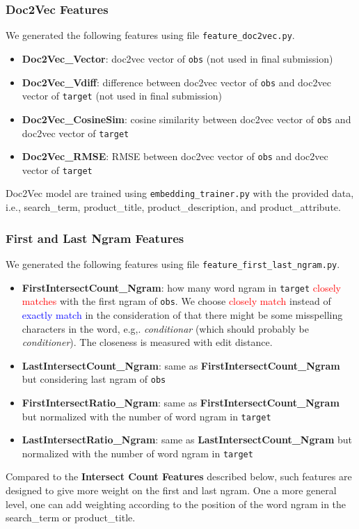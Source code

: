 \documentclass[12pt]{article}
\begin{document}
{{\subsubsection{Doc2Vec Features}
We generated the following features using file \texttt{feature\_doc2vec.py}.
\begin{itemize}
\item \textbf{Doc2Vec\_Vector}: doc2vec vector of \texttt{obs} (not used in final submission)
\item \textbf{Doc2Vec\_Vdiff}: difference between doc2vec vector of \texttt{obs} and doc2vec vector of \texttt{target} (not used in final submission)
\item \textbf{Doc2Vec\_CosineSim}: cosine similarity between doc2vec vector of \texttt{obs} and doc2vec vector of \texttt{target}
\item \textbf{Doc2Vec\_RMSE}: RMSE between doc2vec vector of \texttt{obs} and doc2vec vector of \texttt{target}
\end{itemize}

Doc2Vec model are trained using \texttt{embedding\_trainer.py} with the provided data, i.e., search\_term, product\_title, product\_description, and product\_attribute.

\subsubsection{First and Last Ngram Features}
\label{subsubsec:Feature:Chenglong:First_Last_Ngram}
We generated the following features using file \texttt{feature\_first\_last\_ngram.py}.
\begin{itemize}
\item \textbf{FirstIntersectCount\_Ngram}: how many word ngram in \texttt{target} \textcolor{red}{closely matches} with the first ngram of \texttt{obs}. We choose \textcolor{red}{closely match} instead of \textcolor{blue}{exactly match} in the consideration of that there might be some misspelling characters in the word, e.g,. \emph{conditionar} (which should probably be \emph{conditioner}). The closeness is measured with edit distance.
\item \textbf{LastIntersectCount\_Ngram}: same as \textbf{FirstIntersectCount\_Ngram} but considering last ngram of \texttt{obs}
\item \textbf{FirstIntersectRatio\_Ngram}: same as \textbf{FirstIntersectCount\_Ngram} but normalized with the number of word ngram in \texttt{target}
\item \textbf{LastIntersectRatio\_Ngram}: same as \textbf{LastIntersectCount\_Ngram} but normalized with the number of word ngram in \texttt{target}
\end{itemize}
Compared to the \textbf{Intersect Count Features} described below, such features are designed to give more weight on the first and last ngram. One a more general level, one can add weighting according to the position of the word ngram in the search\_term or product\_title.

}}
\end{document}
